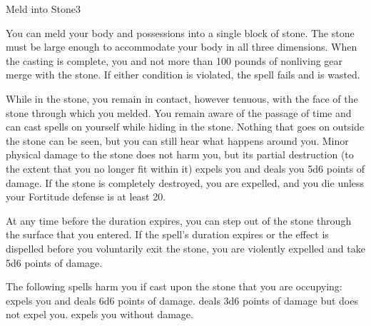 \begin{spellsection}{Meld into Stone}{3}
\begin{spellheader}
\end{spellheader}
\begin{spellcontent}
    \begin{spelltargetinginfo}
    \end{spelltargetinginfo}
    \begin{spelleffects}
        \spelleffect You can meld your body and possessions into a single block of stone. The stone must be large enough to accommodate your body in all three dimensions. When the casting is complete, you and not more than 100 pounds of nonliving gear merge with the stone. If either condition is violated, the spell fails and is wasted.
        \par While in the stone, you remain in contact, however tenuous, with the face of the stone through which you melded. You remain aware of the passage of time and can cast spells on yourself while hiding in the stone. Nothing that goes on outside the stone can be seen, but you can still hear what happens around you. Minor physical damage to the stone does not harm you, but its partial destruction (to the extent that you no longer fit within it) expels you and deals you 5d6 points of damage. If the stone is completely destroyed, you are expelled, and you die unless your Fortitude defense is at least 20.
        \par At any time before the duration expires, you can step out of the stone through the surface that you entered. If the spell's duration expires or the effect is dispelled before you voluntarily exit the stone, you are violently expelled and take 5d6 points of damage.
        \spelldur \durlong
    \end{spelleffects}
\end{spellcontent}
\begin{spellfooter}
    \spellnotes The following spells harm you if cast upon the stone that you are occupying:  expels you and deals 6d6 points of damage.  deals 3d6 points of damage but does not expel you.  expels you without damage.
\end{spellfooter}
\end{spellsection}

